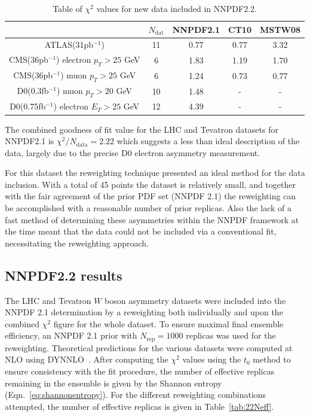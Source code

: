 \begin{table}[ht]
  \begin{center}
    \begin{tabular}{|c|c|c|c|c|}
      \hline
       & $N_{\mathrm{dat}}$& NNPDF2.1 & CT10 & MSTW08 \\
      \hline
      ATLAS(31pb$^{-1}$)                       & 11 & 0.77 & 0.77 & 3.32 \\
      \hline
      CMS(36pb$^{-1}$) electron $p_{T}>25$ GeV &  6 & 1.83 & 1.19  & 1.70 \\
      \hline
      CMS(36pb$^{-1}$) muon $p_{T}>25$ GeV     &  6 & 1.24 & 0.73  & 0.77 \\
      \hline
      \hline
      D0(0.3fb$^{-1}$) muon $p_{T}>20$ GeV     &  10 & 1.48  &  -  & -  \\
            \hline
      D0(0.75fb$^{-1}$) electron $E_{T}>25$ GeV     &  12 & 4.39 & -   & -  \\
      \hline
    \end{tabular}
  \end{center}
  \caption[Table of $\chi^2$ values for new data included in NNPDF2.2]{Table of $\chi^2$ values for new data included in NNPDF2.2. }
  \label{tab:atlas-cms-chi2}
\end{table}

The combined goodness of fit value for the LHC and Tevatron datasets for NNPDF2.1 is $\chi^2/N_{\text{data}} = 2.22$ which suggests a less than ideal description of the data, largely due to the precise D0 electron asymmetry measurement. 

For this dataset the reweighting technique presented an ideal method for the data inclusion. With a total of 45 points the dataset is relatively small, and together with the fair agreement of the prior PDF set (NNPDF 2.1) the reweighting can be accomplished with a reasonable number of prior replicas. Also the lack of a fast method of determining these asymmetries within the NNPDF framework at the time meant that the data could not be included via a conventional fit, necessitating the reweighting approach.

\subsection{NNPDF2.2 results}

The LHC and Tevatron $W$ boson asymmetry datasets were included into the NNPDF 2.1 determination by a reweighting both individually and upon the combined $\chi^2$ figure for the whole dataset. To ensure maximal final ensemble efficiency, an NNPDF 2.1 prior with $N_{\text{rep}} = 1000$ replicas was used for the reweighting. Theoretical predictions for the various datasets were computed at NLO using DYNNLO~\cite{Catani:2007vq}. After computing the $\chi^2$ values using the $t_0$ method to ensure consistency with the fit procedure, the number of effective replicas remaining in the ensemble is given by the Shannon entropy (Eqn.~\ref{eq:shannonentropy}). For the different reweighting combinations attempted, the number of effective replicas is given in Table~\ref{tab:22Neff}.

